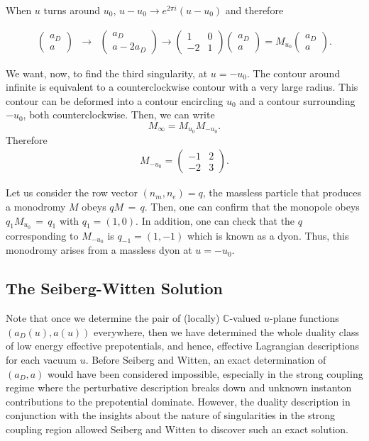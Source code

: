 \documentclass[12pt, onecolumn]{article}
\begin{document}
When $u$ turns around $u_0$, $u-u_0 \rightarrow e^{2\pi i} (u-u_0)$ and therefore 

\begin{eqnarray}
\left(\begin{matrix}
a_D \\ 
a
\end{matrix}\right)&\rightarrow & \left(\begin{matrix}
a_D \\ 
a - 2a_D
\end{matrix}\right) \rightarrow \left( \begin{matrix} 
1 &0 \\ 
-2& 1 \end{matrix} \right) \left(\begin{matrix}
a_D \\ 
a
\end{matrix}\right)  = M_{u_0} \left(\begin{matrix}
a_D \\ 
a
\end{matrix}\right).
\end{eqnarray}

We want, now, to find the third singularity, at $u=-u_0$. The contour around infinite is equivalent to a counterclockwise contour with a very large radius. This contour can be deformed into a contour encircling $u_0$ and a contour surrounding $-u_0$, both counterclockwise. Then, we can write
\begin{equation}
M_\infty= M_{u_0}M_{-u_0}.
\end{equation} 
Therefore
\begin{eqnarray}
M_{-u_0}=\left( \begin{matrix} 
-1 &2 \\ 
-2& 3 \end{matrix} \right).
\end{eqnarray}

Let us consider the row vector $(n_m, n_e)=q$, the massless particle that produces a monodromy $M$ obeys $qM\,=\,q$. Then, one can confirm that the monopole obeys $q_1M_{u_0}\,=\,q_1$ with $q_1=(1,0)$. In addition, one can check that the $q$ corresponding to $M_{-u_0}$ is $q_{-1}=(1,-1)$ which is known as a dyon. Thus, this monodromy arises from a massless dyon at $u=-u_0$.

\subsection{The Seiberg-Witten Solution}
Note that once we determine the pair of (locally) $\mathbb{C}$-valued $u$-plane functions $(a_{D}(u),a(u))$ everywhere, then we have determined the whole duality class of low energy effective prepotentials, and hence, effective Lagrangian descriptions for each vacuum $u$.  Before Seiberg and Witten, an exact determination of $(a_{D},a)$ would have been considered impossible, especially in the strong coupling regime where the perturbative description breaks down and unknown instanton contributions to the prepotential dominate.  However, the duality description in conjunction with the insights about the nature of singularities in the strong coupling region allowed Seiberg and Witten to discover such an exact solution.
\end{document}
